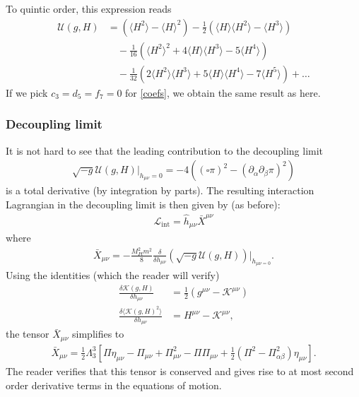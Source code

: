 \documentclass{book}
\theoremstyle{definition}
\newcommand{\p}{\partial}
\newcommand{\lag}{\mathcal{L}}
\newcommand{\nn}{\nonumber}
\newcommand{\al}{\alpha}
\newcommand{\be}{\beta}
\newcommand{\f}[2]{\frac{#1}{#2}}
\newcommand{\lp}{\left(}
\newcommand{\rp}{\right)}
\newcommand{\lb}{\left[}
\newcommand{\rb}{\right]}
\begin{document}
To quintic order, this expression reads
\begin{align}
\mathcal{U}(g,H) &= \lp \langle H^2 \rangle - \langle H \rangle^2\rp - \f{1}{2}\lp \langle H \rangle \langle H^2 \rangle - \langle H^3\rangle \rp \nn\\
&\quad -\f{1}{16}\lp \langle H^2 \rangle^2 + 4\langle H \rangle \langle H^3\rangle - 5\langle H^4\rangle \rp\nn\\
&\quad -\f{1}{32}\lp 2\langle H^2\rangle \langle H^3\rangle + 5\langle H \rangle \langle H^4\rangle - 7\langle H^5 \rangle \rp + \dots
\end{align}
If we pick $c_3 = d_5 = f_7 = 0$ for \eqref{coefs}, we obtain the same result as here. 









\newpage


\subsubsection{Decoupling limit}
It is not hard to see that the leading contribution to the decoupling limit
\begin{align}
\sqrt{-g}\mathcal{U}(g,H)\bigg\vert_{h_{\mu\nu} = 0} = -4\lp (\square \pi)^2 - (\p_\al\p_\be \pi)^2 \rp
\end{align}
is a total derivative (by integration by parts). The resulting interaction Lagrangian in the decoupling limit is then given by (as before):
\begin{align}
\lag_{\text{int}} = \hat{h}_{\mu\nu}\bar{X}^{\mu\nu}
\end{align}
where
\begin{align}
\bar{X}_{\mu\nu} = -\f{M_{Pl}^2m^2}{8}\f{\delta}{\delta h_{\mu\nu}}\lp \sqrt{-g}\mathcal{U}(g,H)\rp\bigg\vert_{h_{\mu\nu = 0}}.
\end{align}
Using the identities (which the reader will verify)
\begin{align}
\f{\delta \mathcal{K}(g,H)}{\delta h_{\mu\nu}}&= \f{1}{2}\lp g^{\mu\nu} - \mathcal{K}^{\mu\nu} \rp\\
\f{\delta \langle \mathcal{K}(g,H)^2 \rangle}{\delta h_{\mu\nu}}&= H^{\mu\nu} - \mathcal{K}^{\mu\nu},
\end{align}
the tensor $\bar{X}_{\mu\nu}$ simplifies to
\begin{align}
\bar{X}_{\mu\nu} = \f{1}{2}\Lambda_3^3\lb \Pi \eta_{\mu\nu} - \Pi_{\mu\nu} + \Pi^2_{\mu\nu} - \Pi\Pi_{\mu\nu} + \f{1}{2}\lp \Pi^2 - \Pi^2_{\al\be} \rp\eta_{\mu\nu} \rb.
\end{align}
The reader verifies that this tensor is conserved and gives rise to at most second order derivative terms in the equations of motion.\\
\end{document}
